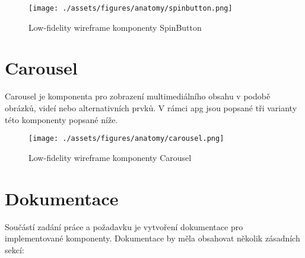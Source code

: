 \begin{figure}[htp]
    \centering
    \texttt{[image: ./assets/figures/anatomy/spinbutton.png]}
    \captionsetup{justification=centering}
    \caption{Low-fidelity wireframe komponenty SpinButton}
\end{figure}

\section{Carousel}

Carousel je komponenta pro zobrazení multimediálního obsahu v podobě obrázků, videí nebo alternativních prvků.
V rámci \gls{apg} jsou popsané tři varianty této komponenty popsané níže.

\begin{figure}[htp]
    \centering
    \texttt{[image: ./assets/figures/anatomy/carousel.png]}
    \captionsetup{justification=centering}
    \caption{Low-fidelity wireframe komponenty Carousel}
\end{figure}







\section{Dokumentace}

Součástí zadání práce a požadavku \hyperref[nfr14]{} je vytvoření dokumentace pro implementované komponenty.
Dokumentace by měla obsahovat několik zásadních sekcí:

